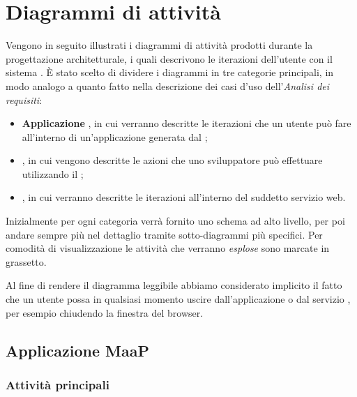 \section{Diagrammi di attività}

Vengono in seguito illustrati i diagrammi di attività prodotti durante la progettazione architetturale, i quali descrivono le iterazioni dell'utente con il sistema . È stato scelto di dividere i diagrammi in tre categorie principali, in modo analogo a quanto fatto nella descrizione dei casi d'uso dell'\textit{Analisi dei requisiti}:

\begin{itemize}

	\item \textbf{Applicazione }, in cui verranno descritte le iterazioni che un utente può fare all'interno di un'applicazione generata dal ;
	\item \textbf{ }, in cui vengono descritte le azioni che uno sviluppatore può effettuare utilizzando il ;
	\item \textbf{}, in cui verranno descritte le iterazioni all'interno del suddetto servizio web.

\end{itemize}
Inizialmente per ogni categoria verrà fornito uno schema ad alto livello, per poi andare sempre più nel dettaglio tramite sotto-diagrammi più specifici. Per comodità di visualizzazione le attività che verranno \textit{esplose} sono marcate in grassetto. 

Al fine di rendere il diagramma leggibile abbiamo considerato implicito il fatto che un utente possa in qualsiasi momento uscire dall'applicazione  o dal servizio , per esempio chiudendo la finestra del browser.

\subsection{Applicazione MaaP}

\subsubsection{Attività principali}

